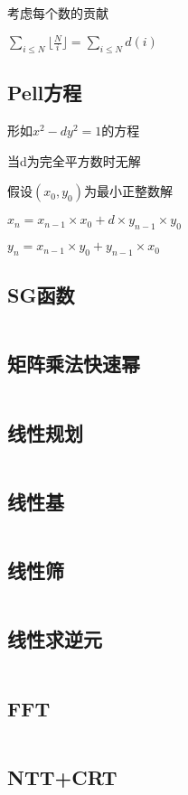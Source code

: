 \documentclass[UTF8]{ctexart}
\begin{document}
考虑每个数的贡献\par

$\sum_{i\leq N}\lfloor \frac{N}{i}\rfloor=\sum_{i\leq N}d(i)$\par

\subsection{Pell方程}

形如$x^2-dy^2=1$的方程\par

当d为完全平方数时无解\par

假设$(x_0,y_0)$为最小正整数解\par

$x_n = x_{n-1} \times x_0 + d \times y_{n-1} \times y_0$\par

$y_n = x_{n-1} \times y_0 + y_{n-1} \times x_0$

\subsection{SG函数}
\inputminted{cpp}{math/SG函数.cpp}
\subsection{矩阵乘法快速幂}
\inputminted{cpp}{math/矩阵乘法快速幂.cpp}
\subsection{线性规划}
\inputminted{cpp}{math/线性规划.cpp}
\subsection{线性基}
\inputminted{cpp}{math/线性基.cpp}
\subsection{线性筛}
\inputminted{cpp}{math/线性筛.cpp}
\subsection{线性求逆元}
\inputminted{cpp}{math/线性求逆元.cpp}
\subsection{FFT}
\inputminted{cpp}{math/FFT.cpp}
\subsection{NTT+CRT}
\inputminted{cpp}{math/NTT+CRT.cpp}
\end{document}
